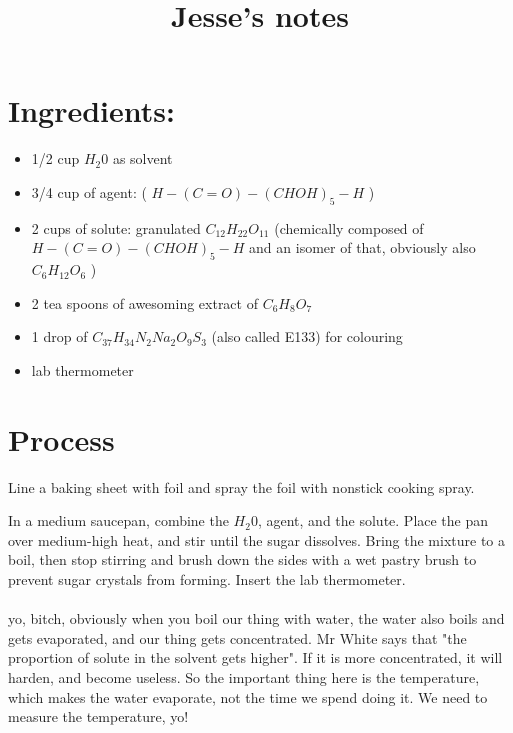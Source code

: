 \documentclass[a4paper,10pt]{article}
\title{Jesse's notes}
\author{}
\date{}
\begin{document}
 
\maketitle

\section*{Ingredients:} 
\begin{itemize}  
  \item 1/2 cup $H_{2}0$ as solvent  
  \item 3/4
  cup of agent: ( $H-(C=O)-(CHOH)_{5}-H$ )  
  \item 2 cups of solute: granulated $C_{12}H_{22}O_{11}$
  (chemically composed of  $H-(C=O)-(CHOH)_{5}-H$ and an isomer of that, obviously
  also $C_{6}H_{12}O_{6}$ )  
  \item 2 tea spoons of awesoming extract of $C_{6}H_{8}O_{7}$   
  \item 1
  drop of $C_{37}H_{34}N_{2}Na_{2}O_{9}S_{3}$ (also called E133) for colouring  
  \item lab thermometer
\end{itemize}





\section*{Process}

Line a baking sheet with          foil and spray the foil with nonstick cooking spray.

In a medium saucepan, combine the $H_{2}0$, agent, and the solute. Place the pan over
medium-high heat, and stir until the sugar dissolves. Bring the mixture to a
boil, then stop stirring and brush down the sides with a wet pastry brush to
prevent sugar crystals from forming. Insert the lab thermometer.
\\
\\
\normalfont\ECFAugie
yo, bitch, obviously when you boil our thing with water, the water also boils and
gets evaporated, and our thing gets concentrated. Mr White says that "the
proportion of solute in the solvent gets higher". If it is more concentrated, it
will harden, and become useless. So the important thing here is the temperature,
which makes the water evaporate, not the time we spend doing it. We need to
measure the temperature, yo!
\end{document}
